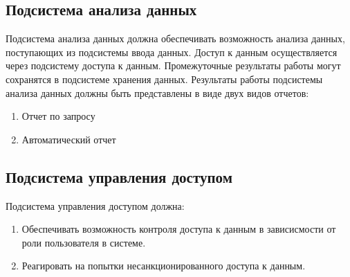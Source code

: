 \subsection{Подсистема анализа данных}
Подсистема анализа данных должна обеспечивать возможность анализа данных,
поступающих из подсистемы ввода данных. Доступ к данным осуществляется через
подсистему доступа к данным. Промежуточные результаты работы могут сохранятся в
подсистеме хранения данных.
Результаты работы подсистемы анализа данных должны быть представлены в виде двух
видов отчетов:

\begin{enumerate}
  \item Отчет по запросу
  \item Автоматический отчет
\end{enumerate}

\subsection{Подсистема управления доступом}
Подсистема управления доступом должна:
\begin{enumerate}
  \item Обеспечивать возможность контроля доступа к данным в зависисмости от роли пользователя в системе.
  \item Реагировать на попытки несанкционированного доступа к данным.
\end{enumerate}
